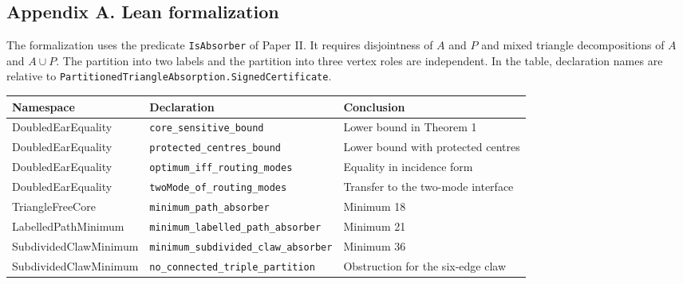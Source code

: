 \documentclass[english,11pt,a4paper]{article}
\newcounter{none}
\begin{document}
\clearpage\subsection{Appendix A. Lean formalization}\label{appendix-a.-lean-formalization}

The formalization uses the predicate \texttt{IsAbsorber} of Paper II. It requires disjointness of \(A\) and \(P\) and mixed triangle decompositions of \(A\) and \(A\cup P\). The partition into two labels and the partition into three vertex roles are independent. In the table, declaration names are relative to \texttt{PartitionedTriangleAbsorption.SignedCertificate}.

{\def\LTcaptype{none} %
\begin{longtable}[]{@{}
  >{\raggedright\arraybackslash}p{}
  >{\raggedright\arraybackslash}p{}
  >{\raggedright\arraybackslash}p{}@{}}
\toprule\noalign{}
\begin{minipage}[b]{\linewidth}\raggedright
Namespace
\end{minipage} & \begin{minipage}[b]{\linewidth}\raggedright
Declaration
\end{minipage} & \begin{minipage}[b]{\linewidth}\raggedright
Conclusion
\end{minipage} \\
\midrule\noalign{}
\endhead
\bottomrule\noalign{}
\endlastfoot
DoubledEarEquality & \texttt{core\_sensitive\_bound} & Lower bound in Theorem 1 \\
DoubledEarEquality & \texttt{protected\_centres\_bound} & Lower bound with protected centres \\
DoubledEarEquality & \texttt{optimum\_iff\_routing\_modes} & Equality in incidence form \\
DoubledEarEquality & \texttt{twoMode\_of\_routing\_modes} & Transfer to the two-mode interface \\
TriangleFreeCore & \texttt{minimum\_path\_absorber} & Minimum 18 \\
LabelledPathMinimum & \texttt{minimum\_labelled\_path\_absorber} & Minimum 21 \\
SubdividedClawMinimum & \texttt{minimum\_subdivided\_claw\_absorber} & Minimum 36 \\
SubdividedClawMinimum & \texttt{no\_connected\_triple\_partition} & Obstruction for the six-edge claw \\
\end{longtable}
}
\end{document}
